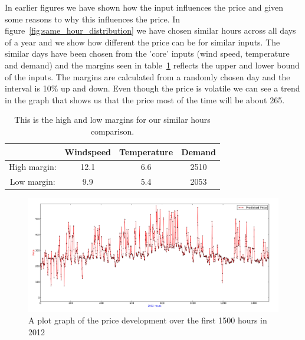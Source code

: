 In earlier figures we have shown how the input influences the price and given some reasons to why this influences the price. In figure~\ref{fig:same_hour_distribution} we have chosen similar hours across all days of a year and we show how different the price can be for similar inputs. The similar days have been chosen from the 'core' inputs (wind speed, temperature and demand) and the margins seen in table~\ref{table:similarHoursLimits} reflects the upper and lower bound of the inputs. The margins are calculated from a randomly chosen day and the interval is 10\% up and down. Even though the price is volatile we can see a trend in the graph that shows us that the price most of the time will be about 265.

\begin{table}[H]
\centering  %
\begin{tabular}{|c|c|c|c|} %
	\hline
 & Windspeed & Temperature & Demand \\ [0.5ex] %
\hline                  %
High margin: & 12.1 & 6.6 & 2510  \\ \hline
Low margin: & 9.9 & 5.4 & 2053 \\  \hline
\end{tabular}
\caption{This is the high and low margins for our similar hours comparison.} %
\label{table:similarHoursLimits} %
\end{table}

\begin{figure}[H]
\centering
\includegraphics[width=\textwidth ]{billeder/energy_price_plots/plotGraph.jpg}
\caption{A plot graph of the price development over the first 1500 hours in 2012}
\label{fig:plotGraph}
\end{figure}

